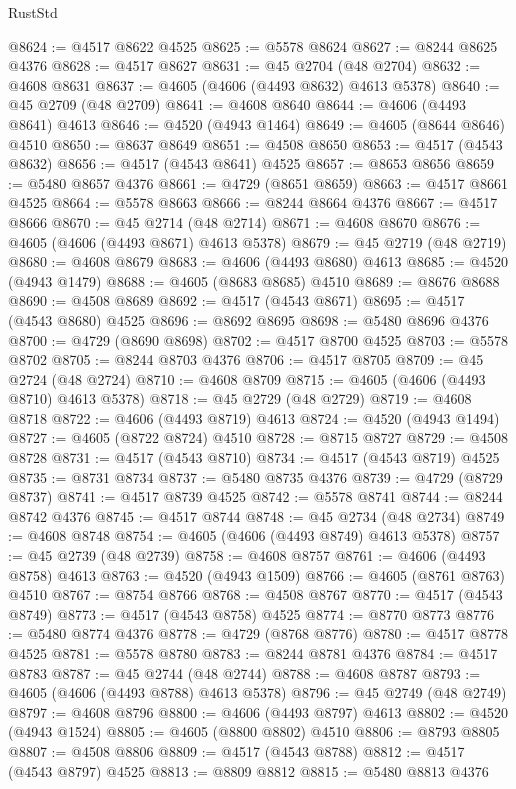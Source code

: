\begin{lexlean}{RustStd}
\begin{coremodule}
@8624 := @4517 @8622 @4525
@8625 := @5578 @8624
@8627 := @8244 @8625 @4376
@8628 := @4517 @8627
@8631 := @45 @2704 (@48 @2704)
@8632 := @4608 @8631
@8637 := @4605 (@4606 (@4493 @8632) @4613 @5378)
@8640 := @45 @2709 (@48 @2709)
@8641 := @4608 @8640
@8644 := @4606 (@4493 @8641) @4613
@8646 := @4520 (@4943 @1464)
@8649 := @4605 (@8644 @8646) @4510
@8650 := @8637 @8649
@8651 := @4508 @8650
@8653 := @4517 (@4543 @8632)
@8656 := @4517 (@4543 @8641) @4525
@8657 := @8653 @8656
@8659 := @5480 @8657 @4376
@8661 := @4729 (@8651 @8659)
@8663 := @4517 @8661 @4525
@8664 := @5578 @8663
@8666 := @8244 @8664 @4376
@8667 := @4517 @8666
@8670 := @45 @2714 (@48 @2714)
@8671 := @4608 @8670
@8676 := @4605 (@4606 (@4493 @8671) @4613 @5378)
@8679 := @45 @2719 (@48 @2719)
@8680 := @4608 @8679
@8683 := @4606 (@4493 @8680) @4613
@8685 := @4520 (@4943 @1479)
@8688 := @4605 (@8683 @8685) @4510
@8689 := @8676 @8688
@8690 := @4508 @8689
@8692 := @4517 (@4543 @8671)
@8695 := @4517 (@4543 @8680) @4525
@8696 := @8692 @8695
@8698 := @5480 @8696 @4376
@8700 := @4729 (@8690 @8698)
@8702 := @4517 @8700 @4525
@8703 := @5578 @8702
@8705 := @8244 @8703 @4376
@8706 := @4517 @8705
@8709 := @45 @2724 (@48 @2724)
@8710 := @4608 @8709
@8715 := @4605 (@4606 (@4493 @8710) @4613 @5378)
@8718 := @45 @2729 (@48 @2729)
@8719 := @4608 @8718
@8722 := @4606 (@4493 @8719) @4613
@8724 := @4520 (@4943 @1494)
@8727 := @4605 (@8722 @8724) @4510
@8728 := @8715 @8727
@8729 := @4508 @8728
@8731 := @4517 (@4543 @8710)
@8734 := @4517 (@4543 @8719) @4525
@8735 := @8731 @8734
@8737 := @5480 @8735 @4376
@8739 := @4729 (@8729 @8737)
@8741 := @4517 @8739 @4525
@8742 := @5578 @8741
@8744 := @8244 @8742 @4376
@8745 := @4517 @8744
@8748 := @45 @2734 (@48 @2734)
@8749 := @4608 @8748
@8754 := @4605 (@4606 (@4493 @8749) @4613 @5378)
@8757 := @45 @2739 (@48 @2739)
@8758 := @4608 @8757
@8761 := @4606 (@4493 @8758) @4613
@8763 := @4520 (@4943 @1509)
@8766 := @4605 (@8761 @8763) @4510
@8767 := @8754 @8766
@8768 := @4508 @8767
@8770 := @4517 (@4543 @8749)
@8773 := @4517 (@4543 @8758) @4525
@8774 := @8770 @8773
@8776 := @5480 @8774 @4376
@8778 := @4729 (@8768 @8776)
@8780 := @4517 @8778 @4525
@8781 := @5578 @8780
@8783 := @8244 @8781 @4376
@8784 := @4517 @8783
@8787 := @45 @2744 (@48 @2744)
@8788 := @4608 @8787
@8793 := @4605 (@4606 (@4493 @8788) @4613 @5378)
@8796 := @45 @2749 (@48 @2749)
@8797 := @4608 @8796
@8800 := @4606 (@4493 @8797) @4613
@8802 := @4520 (@4943 @1524)
@8805 := @4605 (@8800 @8802) @4510
@8806 := @8793 @8805
@8807 := @4508 @8806
@8809 := @4517 (@4543 @8788)
@8812 := @4517 (@4543 @8797) @4525
@8813 := @8809 @8812
@8815 := @5480 @8813 @4376

\end{coremodule}
\end{lexlean}
